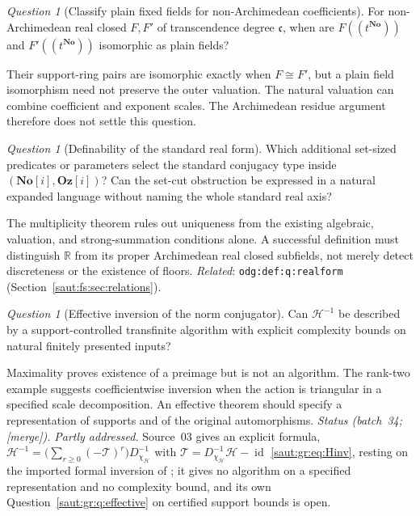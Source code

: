 \documentclass[11pt]{article}
\theoremstyle{definition}
\theoremstyle{remark}
\newtheorem{question}[theorem]{Question}
\newcommand{\No}{\mathbf{No}}
\newcommand{\R}{\mathbb R}
\newcommand{\id}{\operatorname{id}}
\newcommand{\lbl}[1]{\nolinkurl{#1}}%
\newcommand{\Oz}{\mathbf{Oz}}
\newcommand{\cc}{\mathfrak c}
\newcommand{\mergetag}{\textup{[merge]}}
\numberwithin{equation}{section}
\begin{document}
\begin{question}[Classify plain fixed fields for non-Archimedean coefficients]\label{saut:fs:q:nonarch}
For non-Archimedean real closed $F,F'$ of transcendence degree $\cc$, when are
$F((t^{\No}))$ and $F'((t^{\No}))$ isomorphic as plain fields?
\end{question}
Their support-ring pairs are isomorphic exactly when $F\cong F'$, but a plain field
isomorphism need not preserve the outer valuation. The natural valuation can combine
coefficient and exponent scales. The Archimedean residue argument therefore does not
settle this question.

\begin{question}[Definability of the standard real form]\label{saut:fs:q:definability}
Which additional set-sized predicates or parameters select the standard conjugacy type
inside $(\No[i],\Oz[i])$? Can the set-cut obstruction be expressed in a natural expanded
language without naming the whole standard real axis?
\end{question}
The multiplicity theorem rules out uniqueness from the existing algebraic, valuation,
and strong-summation conditions alone. A successful definition must distinguish $\R$
from its proper Archimedean real closed subfields, not merely detect discreteness or
the existence of floors. \emph{Related}: \lbl{odg:def:q:realform}
(Section~\ref{saut:fs:sec:relations}).

\begin{question}[Effective inversion of the norm conjugator]\label{saut:fs:q:effective}
Can $\mathcal H^{-1}$ be described by a support-controlled transfinite algorithm with
explicit complexity bounds on natural finitely presented inputs?
\end{question}
Maximality proves existence of a preimage but is not an algorithm. The rank-two
example suggests coefficientwise inversion when the action is triangular in a
specified scale decomposition. An effective theorem should specify a representation of
supports and of the original automorphisms. \emph{Status (batch~34; \mergetag).}
\emph{Partly addressed.} Source~03 gives an explicit formula,
$\mathcal H^{-1}=\bigl(\sum_{r\ge0}(-\mathcal T)^r\bigr)D_{\chi_{\mathcal H}}^{-1}$ with
$\mathcal T=D_{\chi_{\mathcal H}}^{-1}\mathcal H-\id$ \eqref{saut:gr:eq:Hinv}, resting on the
imported formal inversion of \cite{BKKS}; it gives no algorithm on a specified
representation and no complexity bound, and its own
Question~\ref{saut:gr:q:effective} on certified support bounds is open.
\end{document}
